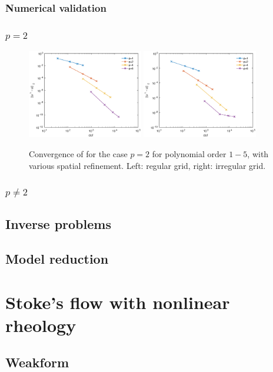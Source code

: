 \documentclass[a4paper,11pt]{scrartcl}
\begin{document}
\subsubsection{Numerical validation}

\subsubsection*{$p=2$}


\begin{figure}[h]
\centerline{\includegraphics[width=0.45\textwidth]{conv_p2_reg.eps}
\includegraphics[width=0.45\textwidth]{conv_p2_ireg.eps}}
\caption{Convergence of for the case $p=2$ for polynomial order $1-5$, with various spatial refinement. Left: regular grid, right: irregular grid. }
\label{fig:convp2}
\end{figure}


\subsubsection*{$p\neq2$}

\subsection{Inverse problems}

\subsection{Model reduction}

\section{Stoke's flow with nonlinear rheology}

\subsection{Weakform}

\subsection{}
\end{document}
